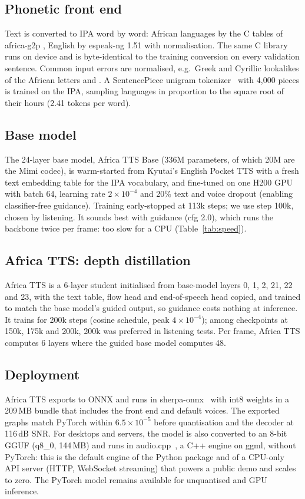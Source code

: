 \documentclass[10pt,twocolumn]{article}
\newcommand{\att}{Africa TTS}
\newcommand{\attbase}{Africa TTS Base}
\begin{document}
\subsection{Phonetic front end}
Text is converted to IPA word by word: African languages by the C tables of africa-g2p
\cite{africag2p}, English by espeak-ng 1.51 with normalisation. The same C library runs on
device and is byte-identical to the training conversion on every validation sentence. Common
input errors are normalised, e.g.\ Greek and Cyrillic lookalikes of the African letters
\textepsilon{} and \textopeno{}. A SentencePiece unigram tokenizer~\cite{kudo2018sentencepiece}
with 4{,}000 pieces is trained on the IPA, sampling languages in proportion to the square root
of their hours (2.41 tokens per word).

\subsection{Base model}
The 24-layer base model, \attbase{} (336M parameters, of which 20M are the Mimi codec), is
warm-started from Kyutai's English Pocket TTS with a fresh text embedding table for the IPA
vocabulary, and fine-tuned on one H200 GPU with batch 64, learning rate $2\times10^{-4}$ and
20\% text and voice dropout (enabling classifier-free guidance). Training early-stopped at
113k steps; we use step 100k, chosen by listening. It sounds best with guidance (cfg 2.0),
which runs the backbone twice per frame: too slow for a CPU (Table~\ref{tab:speed}).

\subsection{\att{}: depth distillation}
\att{} is a 6-layer student initialised from base-model layers 0, 1, 2, 21, 22 and 23, with the
text table, flow head and end-of-speech head copied, and trained to match the base model's guided
output, so guidance costs nothing at inference. It trains for 200k steps (cosine schedule,
peak $4\times10^{-4}$); among checkpoints at 150k, 175k and 200k, 200k was preferred in
listening tests. Per frame, \att{} computes 6 layers where the guided base model computes 48.

\subsection{Deployment}
\att{} exports to ONNX and runs in sherpa-onnx~\cite{sherpaonnx} with int8 weights in a 209\,MB
bundle that includes the front end and default voices. The exported graphs match PyTorch within $6.5\times10^{-5}$ before quantisation and the decoder at 116\,dB
SNR. For desktops and servers, the model is also converted to an 8-bit GGUF (q8\_0, 144\,MB) and
runs in audio.cpp~\cite{audiocpp}, a C++ engine on ggml, without PyTorch: this is the default engine
of the Python package and of a CPU-only API server (HTTP, WebSocket streaming) that powers a public
demo and scales to zero. The PyTorch model remains available for unquantised and GPU inference.
\end{document}
